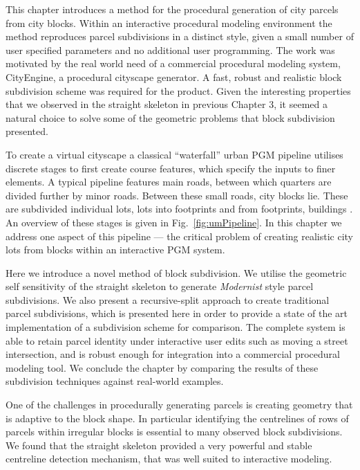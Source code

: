 This chapter introduces a method for the procedural generation of city parcels from city blocks. Within an interactive procedural modeling environment the method reproduces parcel subdivisions in a distinct style, given a small number of user specified parameters and no additional user programming. The work was motivated by the real world need of a commercial procedural modeling system, CityEngine\cite{cityEngine}, a procedural cityscape generator. A fast, robust and realistic block subdivision scheme was required for the product. Given the interesting properties that we observed in the straight skeleton in previous Chapter 3, it seemed a natural choice to solve some of the geometric problems that block subdivision presented. 

To create a virtual cityscape a classical ``waterfall'' urban PGM pipeline utilises discrete stages to first create course features, which specify the inputs to finer elements. A typical pipeline features main roads, between which quarters are divided further by minor roads. Between these small roads, city blocks lie. These are subdivided individual lots, lots into footprints and from footprints, buildings . An overview of these stages is given in Fig.~\ref{fig:umPipeline}. In this chapter we address one aspect of this pipeline --- the critical problem of creating realistic city lots from blocks within an interactive PGM system. 


Here we introduce a novel method of block subdivision. We utilise the geometric self sensitivity of the straight skeleton to generate \emph{Modernist} style parcel subdivisions. 
We also present a recursive-split approach to create traditional parcel subdivisions, which is presented here in order to provide a state of the art implementation of a subdivision scheme for comparison. 
The complete system is able to retain parcel identity under interactive user edits such as moving a street intersection, and is robust enough for integration into a commercial procedural modeling tool. We conclude the chapter by comparing the results of these subdivision techniques against real-world examples.
\kawt


One of the challenges in procedurally generating parcels is creating geometry that is adaptive to the block shape. In particular identifying the centrelines of rows of parcels within irregular blocks is essential to many observed block subdivisions. We found that the straight skeleton provided a very powerful and stable centreline detection mechanism, that was well suited to interactive modeling.

